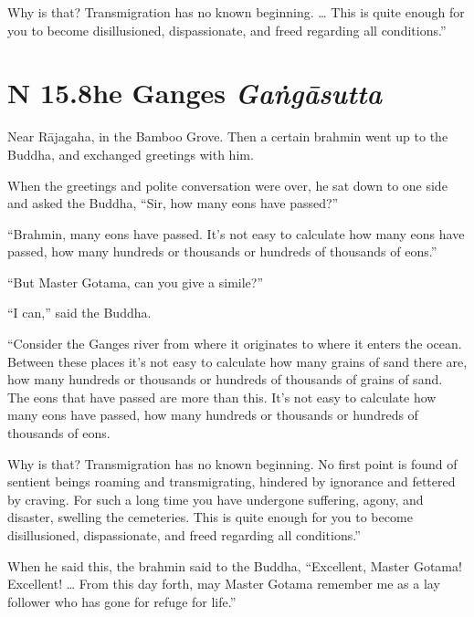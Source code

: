 \documentclass[12pt,openany]{book}%
\newcommand*{\suttatitleacronym}[1]{\smaller[2]{#1}\vspace*{.3em}}
\newcommand*{\suttatitletranslation}[1]{\linebreak{#1}}
\newcommand*{\suttatitleroot}[1]{\linebreak\smaller[2]\itshape{#1}}
\newcommand*{\tocacronym}[1]{\hspace*{-3.3em}{#1}\quad}
\newcommand*{\toctranslation}[1]{#1}
\newcommand*{\tocroot}[1]{(\textit{#1})}
\begin{document}
Why is that? Transmigration has no known beginning. … This is quite enough for you to become disillusioned, dispassionate, and freed regarding all conditions.” 

%
\section*{{\suttatitleacronym SN 15.8}{\suttatitletranslation The Ganges }{\suttatitleroot Gaṅgāsutta}}
\addcontentsline{toc}{section}{\tocacronym{SN 15.8} \toctranslation{The Ganges } \tocroot{Gaṅgāsutta}}

Near \textsanskrit{Rājagaha}, in the Bamboo Grove. Then a certain brahmin went up to the Buddha, and exchanged greetings with him. 

When the greetings and polite conversation were over, he sat down to one side and asked the Buddha, “Sir, how many eons have passed?” 

“Brahmin, many eons have passed. It’s not easy to calculate how many eons have passed, how many hundreds or thousands or hundreds of thousands of eons.” 

“But Master Gotama, can you give a simile?” 

“I can,” said the Buddha. 

“Consider the Ganges river from where it originates to where it enters the ocean. Between these places it’s not easy to calculate how many grains of sand there are, how many hundreds or thousands or hundreds of thousands of grains of sand. The eons that have passed are more than this. It’s not easy to calculate how many eons have passed, how many hundreds or thousands or hundreds of thousands of eons. 

Why is that? Transmigration has no known beginning. No first point is found of sentient beings roaming and transmigrating, hindered by ignorance and fettered by craving. For such a long time you have undergone suffering, agony, and disaster, swelling the cemeteries. This is quite enough for you to become disillusioned, dispassionate, and freed regarding all conditions.” 

When he said this, the brahmin said to the Buddha, “Excellent, Master Gotama! Excellent! … From this day forth, may Master Gotama remember me as a lay follower who has gone for refuge for life.” 
\end{document}
